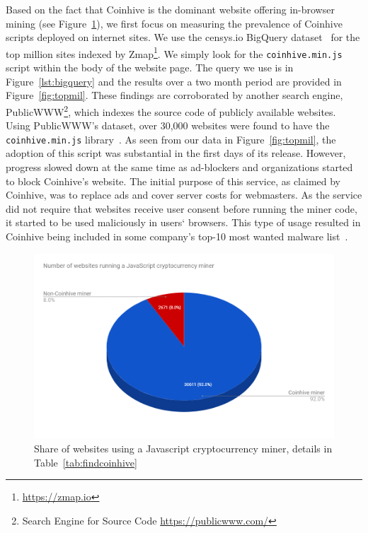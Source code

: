 Based on the fact that Coinhive is the dominant website offering in-browser mining  (see Figure~\ref{fig:coinhivevscopycats}), we first focus on measuring the prevalence of Coinhive scripts deployed on internet sites. We use the censys.io BigQuery dataset~\cite{censys15} for the top million sites indexed by Zmap\footnote{\url{https://zmap.io}}. We simply look for the \texttt{coinhive.min.js} script within the body of the website page. The query we use is in Figure~\ref{lst:bigquery} and the results over a two month period are provided in Figure~\ref{fig:topmil}. These findings are corroborated by another search engine, PublicWWW\footnote{Search Engine for Source Code \url{https://publicwww.com/}}, which indexes the source code of publicly available websites. Using PublicWWW's dataset, over 30,000 websites were found to have the \texttt{coinhive.min.js} library~\cite{badpacketspublicwww}. As seen from our data in Figure~\ref{fig:topmil}, the adoption of this script was substantial in the first days of its release. However, progress slowed down at the same time as ad-blockers and organizations started to block Coinhive's website. The initial purpose of this service, as claimed by Coinhive, was to replace ads and cover server costs for webmasters. As the service did not require that websites receive user consent before running the miner code, it started to be used maliciously in users` browsers. This type of usage resulted in Coinhive being included in some company's top-10 most wanted malware list~\cite{checkpoint}.


\begin{figure}[h]
\centering
\includegraphics[width=0.9\linewidth]{figures/coinhive-miners-pie.png}
\caption[Coinhive Market Share]{Share of websites using a Javascript cryptocurrency miner, details in Table~\ref{tab:findcoinhive}  \label{fig:coinhivevscopycats}}
\end{figure}


